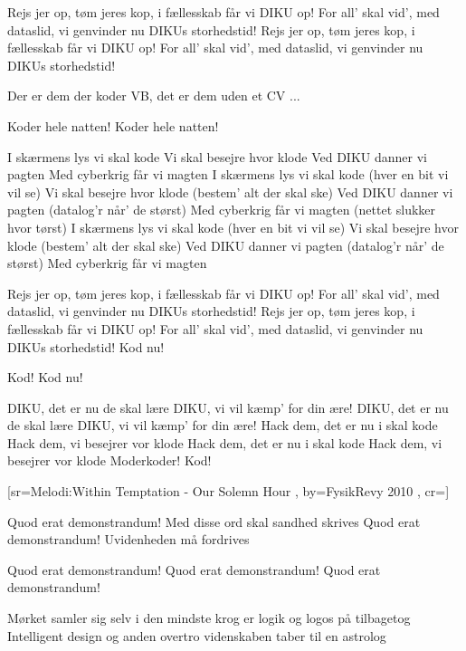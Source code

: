 \documentclass[pdftex,12pt]{article}
\begin{document}
\begin{songs}{}
\endverse
\beginverse
Rejs jer op, tøm jeres kop, i fællesskab får vi DIKU op!
For all' skal vid', med dataslid, vi genvinder nu DIKUs storhedstid!
Rejs jer op, tøm jeres kop, i fællesskab får vi DIKU op!
For all' skal vid', med dataslid, vi genvinder nu DIKUs storhedstid!

\endverse
\beginverse
Der er dem der koder VB, det er dem uden et CV ...

\endverse
\beginverse
Koder hele natten!
Koder hele natten!

\endverse
\beginverse
I skærmens lys vi skal kode
Vi skal besejre hvor klode
Ved DIKU danner vi pagten
Med cyberkrig får vi magten
I skærmens lys vi skal kode (hver en bit vi vil se)
Vi skal besejre hvor klode (bestem' alt der skal ske)
Ved DIKU danner vi pagten (datalog'r når' de størst)
Med cyberkrig får vi magten (nettet slukker hvor tørst)
I skærmens lys vi skal kode (hver en bit vi vil se)
Vi skal besejre hvor klode (bestem' alt der skal ske)
Ved DIKU danner vi pagten (datalog'r når' de størst)
Med cyberkrig får vi magten

\endverse
\beginverse
Rejs jer op, tøm jeres kop, i fællesskab får vi DIKU op!
For all' skal vid', med dataslid, vi genvinder nu DIKUs storhedstid!
Rejs jer op, tøm jeres kop, i fællesskab får vi DIKU op!
For all' skal vid', med dataslid, vi genvinder nu DIKUs storhedstid!
Kod nu!

\endverse
\beginverse
Kod! Kod nu!

\endverse
\beginverse
DIKU, det er nu de skal lære
DIKU, vi vil kæmp' for din ære!
DIKU, det er nu de skal lære
DIKU, vi vil kæmp' for din ære!
Hack dem, det er nu i skal kode
Hack dem, vi besejrer vor klode
Hack dem, det er nu i skal kode
Hack dem, vi besejrer vor klode
Moderkoder!
Kod!

\endverse
\endsong



[sr={Melodi:Within Temptation - Our Solemn Hour}
,
by={FysikRevy  2010}
,
cr={}]\hypertarget{Q.E.D.}{}
\label{song62}

\beginverse
Quod erat demonstrandum!
Med disse ord skal sandhed skrives
Quod erat demonstrandum!
Uvidenheden må fordrives

\endverse
\beginverse
Quod erat demonstrandum!
Quod erat demonstrandum!
Quod erat demonstrandum!

\endverse
\beginverse
Mørket samler sig
selv i den mindste krog
er logik og logos på tilbagetog
Intelligent design
og anden overtro
videnskaben taber til en astrolog


\end{songs}
\end{document}
